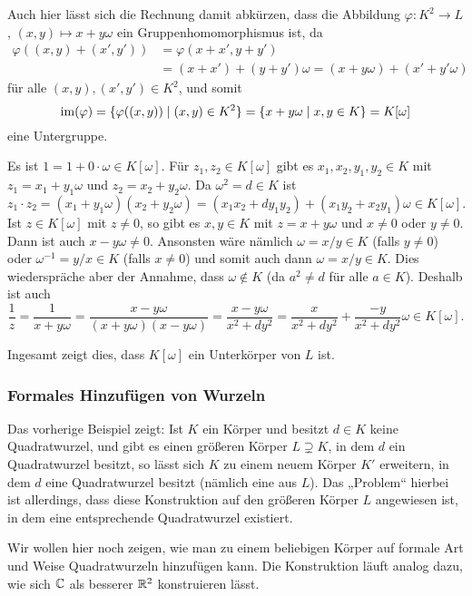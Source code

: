 \begin{bem}
 Auch hier lässt sich die Rechnung damit abkürzen, dass die Abbildung $\varphi \colon K^2 \to L$, $(x,y) \mapsto x+y\omega$ ein Gruppenhomomorphismus ist, da
 \begin{align*}
  \varphi((x,y) + (x',y'))
  &= \varphi(x+x', y+y') \\
  &= (x+x') + (y+y')\omega
  = (x + y\omega) + (x' + y'\omega)
 \end{align*}
 für alle $(x, y), (x', y') \in K^2$, und somit
 \[
  \mathrm{im}(\varphi)
  = \{\varphi((x,y)) \mid (x,y) \in K^2\}
  = \{x+y\omega \mid x,y \in K\}
  = K[\omega]
 \]
 eine Untergruppe.
\end{bem}

Es ist $1 = 1 + 0 \cdot \omega \in K[\omega]$. Für $z_1, z_2 \in K[\omega]$ gibt es $x_1, x_2, y_1, y_2 \in K$ mit $z_1 = x_1 + y_1 \omega$ und $z_2 = x_2 + y_2 \omega$. Da $\omega^2 = d \in K$ ist
\[
 z_1 \cdot z_2
 = (x_1 + y_1 \omega) (x_2 + y_2 \omega)
 = (x_1 x_2 + d y_1 y_2) + (x_1 y_2 + x_2 y_1) \omega
 \in K[\omega].
\]
Ist $z \in K[\omega]$ mit $z \neq 0$, so gibt es $x,y \in K$ mit $z = x+y\omega$ und $x \neq 0$ oder $y \neq 0$. Dann ist auch $x-y\omega \neq 0$. Ansonsten wäre nämlich $\omega = x/y \in K$ (falls $y \neq 0$) oder $\omega^{-1} = y/x \in K$ (falls $x \neq 0$) und somit auch dann $\omega = x/y \in K$. Dies wiederspräche aber der Annahme, dass $\omega \notin K$ (da $a^2 \neq d$ für alle $a \in K$). Deshalb ist auch
\[
 \frac{1}{z}
 = \frac{1}{x+y\omega}
 = \frac{x-y\omega}{(x+y\omega)(x-y\omega)}
 = \frac{x-y\omega}{x^2 + dy^2}
 = \frac{x}{x^2 + dy^2} + \frac{-y}{x^2 + dy^2}\omega \in K[\omega].
\]

Ingesamt zeigt dies, dass $K[\omega]$ ein Unterkörper von $L$ ist.


\subsubsection{Formales Hinzufügen von Wurzeln}
Das vorherige Beispiel zeigt: Ist $K$ ein Körper und besitzt $d \in K$ keine Quadratwurzel, und gibt es einen größeren Körper $L \supsetneq K$, in dem $d$ ein Quadratwurzel besitzt, so lässt sich $K$ zu einem neuem Körper $K'$ erweitern, in dem $d$ eine Quadratwurzel besitzt (nämlich eine aus $L$). Das „Problem“ hierbei ist allerdings, dass diese Konstruktion auf den größeren Körper $L$ angewiesen ist, in dem eine entsprechende Quadratwurzel existiert.

Wir wollen hier noch zeigen, wie man zu einem beliebigen Körper auf formale Art und Weise Quadratwurzeln hinzufügen kann. Die Konstruktion läuft analog dazu, wie sich $\mathbb{C}$ als besserer $\mathbb{R}^2$ konstruieren lässt.

